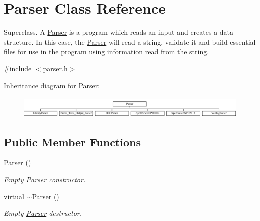 \hypertarget{classParser}{\section{Parser Class Reference}
\label{classParser}
}


Superclass. A \hyperlink{classParser}{Parser} is a program which reads an input and creates a data structure. In this case, the \hyperlink{classParser}{Parser} will read a string, validate it and build essential files for use in the program using information read from the string.  




{\ttfamily \#include $<$parser.\-h$>$}

Inheritance diagram for Parser\-:\begin{figure}[H]
\begin{center}
\leavevmode
\includegraphics[height=1.072797cm]{classParser}
\end{center}
\end{figure}
\subsection*{Public Member Functions}
\begin{DoxyCompactItemize}
\item 
\hypertarget{classParser_a12234f6cd36b61af4b50c94a179422c1}{\hyperlink{classParser_a12234f6cd36b61af4b50c94a179422c1}{Parser} ()}\label{classParser_a12234f6cd36b61af4b50c94a179422c1}

\begin{DoxyCompactList}\small\item\em Empty \hyperlink{classParser}{Parser} constructor. \end{DoxyCompactList}\item 
\hypertarget{classParser_ad576b92b9cc324f6f41b0269a9a1a546}{virtual \hyperlink{classParser_ad576b92b9cc324f6f41b0269a9a1a546}{$\sim$\-Parser} ()}\label{classParser_ad576b92b9cc324f6f41b0269a9a1a546}

\begin{DoxyCompactList}\small\item\em Empty \hyperlink{classParser}{Parser} destructor. \end{DoxyCompactList}\end{DoxyCompactItemize}
